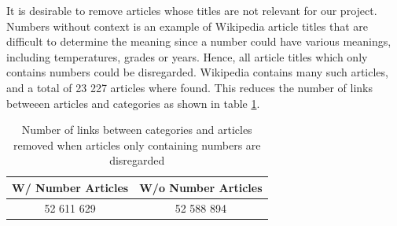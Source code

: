 It is desirable to remove articles whose titles are not relevant for our project. Numbers without context is an example of Wikipedia article titles that are difficult to determine the meaning since a number could have various meanings, including temperatures, grades or years. Hence, all article titles which only contains numbers could be disregarded. Wikipedia contains many such articles, and a total of 23 227 articles where found. This reduces the number of links betweeen articles and categories as shown in table  \ref{tab:withoutnumber}.

\begin{table}[h]
\centering
\begin{tabular}{c|c}
\textbf{W/ Number Articles} & \textbf{W/o Number Articles}  \\ \hline
52 611 629 & 52 588 894
\end{tabular}
\caption[Number of links without number articles]{Number of links between categories and articles removed when articles only containing numbers are disregarded}
\label{tab:withoutnumber}
\end{table}


